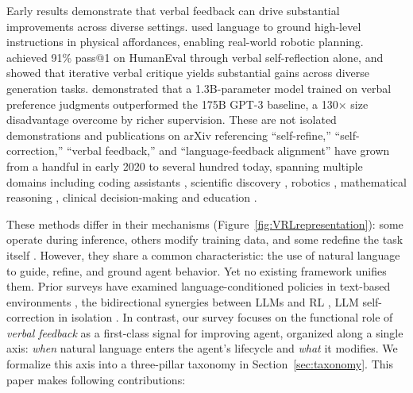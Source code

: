 Early results demonstrate that verbal feedback can drive substantial improvements across diverse settings. \citet{ahn2022can} used language to ground high-level instructions in physical affordances, enabling real-world robotic planning. \citet{shinn2023reflexion} achieved 91\% pass@1 on HumanEval through verbal self-reflection alone, and \citet{madaan2023selfrefine} showed that iterative verbal critique yields substantial gains across diverse generation tasks. \citet{ouyang2022training} demonstrated that a 1.3B-parameter model trained on verbal preference judgments outperformed the 175B GPT-3 baseline, a 130$\times$ size disadvantage overcome by richer supervision. These are not isolated demonstrations and publications on arXiv referencing ``self-refine,'' ``self-correction,'' ``verbal feedback,'' and ``language-feedback alignment'' have grown from a handful in early 2020 to several hundred today, spanning multiple domains including coding assistants \citep{yang2024swe, jimenez2024swebenchlanguagemodelsresolve}, scientific discovery \citep{m2024augmenting, lu2024ai}, robotics \citep{wang2023voyager}, mathematical reasoning \citep{hatamizadeh2026igrpo, liu2026dual, shi2025ssr}, clinical decision-making \citep{huang2025medreflect, zhou2025enhancing} and education \citep{qian2025dean, ahtisham2026ai}.



These methods differ in their mechanisms (Figure~\ref{fig:VRLrepresentation}): some operate during inference, others modify training data, and some redefine the task itself . However, they share a common characteristic: the use of natural language to guide, refine, and ground agent behavior. Yet no existing framework unifies them. Prior surveys have examined language-conditioned policies in text-based environments \citep{luketina2019survey}, the bidirectional synergies between LLMs and RL \citep{pternea2024rl}, LLM self-correction in isolation \citep{kamoi2024can}. In contrast, our survey focuses on the functional role of \emph{verbal feedback} as a first-class signal for improving agent, organized along a single axis: \emph{when} natural language enters the agent's lifecycle and \emph{what} it modifies. We formalize this axis into a three-pillar taxonomy in Section~\ref{sec:taxonomy}. This paper makes following contributions:

